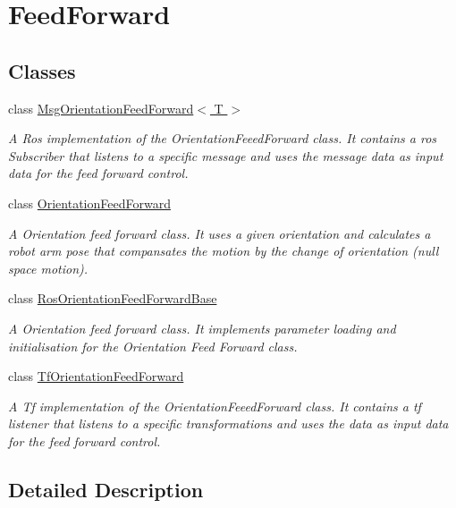 \hypertarget{group__FeedForward}{}\section{Feed\+Forward}
\label{group__FeedForward}
\subsection*{Classes}
\begin{DoxyCompactItemize}
\item 
class \hyperlink{classMsgOrientationFeedForward}{Msg\+Orientation\+Feed\+Forward$<$ T $>$}
\begin{DoxyCompactList}\small\item\em A Ros implementation of the Orientation\+Feeed\+Forward class. It contains a ros Subscriber that listens to a specific message and uses the message data as input data for the feed forward control. \end{DoxyCompactList}\item 
class \hyperlink{classOrientationFeedForward}{Orientation\+Feed\+Forward}
\begin{DoxyCompactList}\small\item\em A Orientation feed forward class. It uses a given orientation and calculates a robot arm pose that compansates the motion by the change of orientation (null space motion). \end{DoxyCompactList}\item 
class \hyperlink{classRosOrientationFeedForwardBase}{Ros\+Orientation\+Feed\+Forward\+Base}
\begin{DoxyCompactList}\small\item\em A Orientation feed forward class. It implements parameter loading and initialisation for the Orientation Feed Forward class. \end{DoxyCompactList}\item 
class \hyperlink{classTfOrientationFeedForward}{Tf\+Orientation\+Feed\+Forward}
\begin{DoxyCompactList}\small\item\em A Tf implementation of the Orientation\+Feeed\+Forward class. It contains a tf listener that listens to a specific transformations and uses the data as input data for the feed forward control. \end{DoxyCompactList}\end{DoxyCompactItemize}


\subsection{Detailed Description}
